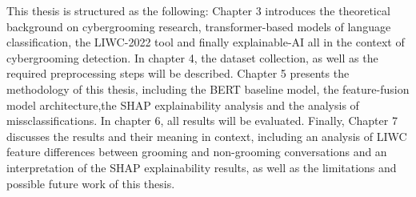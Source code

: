 This thesis is structured as the following: Chapter 3 introduces the theoretical background on cybergrooming research, transformer-based models of language classification, the LIWC-2022 tool and finally explainable-AI all in the context of cybergrooming detection. In chapter 4, the dataset collection, as well as the required preprocessing steps will be described. Chapter 5 presents the methodology of this thesis, including the BERT baseline model, the feature-fusion model architecture,the SHAP explainability analysis and the analysis of missclassifications. In chapter 6, all results will be evaluated. Finally, Chapter 7 discusses the results and their meaning in context, including an analysis of LIWC feature differences between grooming and non-grooming conversations and an interpretation of the SHAP explainability results, as well as the limitations and possible future work of this thesis.

